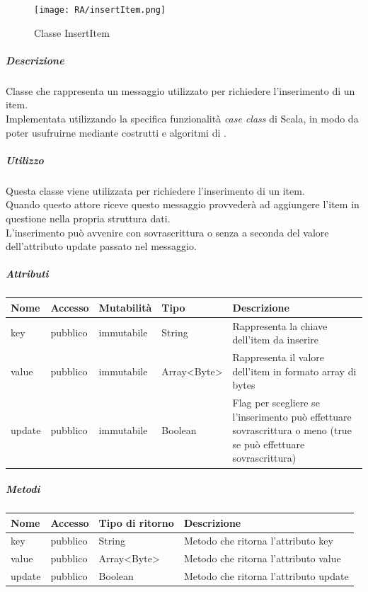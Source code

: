 \documentclass{scalatekids-article}
\begin{document}
\begin{figure}[H]
  \begin{center}
    \texttt{[image: RA/insertItem.png]}
    \caption{Classe InsertItem}
  \end{center}
\end{figure}

\subparagraph{Descrizione}
Classe che rappresenta un messaggio utilizzato per richiedere l'inserimento di
un item.\\Implementata utilizzando la specifica funzionalità \textit{case class} di Scala,
in modo da poter usufruirne mediante costrutti e algoritmi di
.

\subparagraph{Utilizzo}
Questa classe viene utilizzata per richiedere l'inserimento di un item.\\Quando questo attore riceve questo messaggio provvederà ad aggiungere l'item in
questione nella propria struttura dati.\\L'inserimento può avvenire con
sovrascrittura o senza a seconda del valore dell'attributo update passato nel
messaggio.

\subparagraph{Attributi}
\begin{tabular}{| p{2cm} | p{1.5cm} | p{2cm} | p{3cm} | p{8.5cm} |}
  \hline
  Nome & Accesso & Mutabilità & Tipo & Descrizione\\
  \hline
  key & pubblico & immutabile & String & Rappresenta la chiave dell'item da inserire\\
  \hline
  value & pubblico & immutabile & Array<Byte> & Rappresenta il valore dell'item in formato array di bytes\\
  \hline
  update & pubblico & immutabile & Boolean & Flag per scegliere se l'inserimento può effettuare sovrascrittura o meno (true se può effettuare sovrascrittura)\\
  \hline
\end{tabular}

\subparagraph{Metodi}
\begin{tabular}{| l | l | l | l |}
  \hline
  Nome & Accesso & Tipo di ritorno & Descrizione\\
  \hline
  key & pubblico & String & Metodo che ritorna l'attributo key\\
  \hline
  value & pubblico & Array<Byte> & Metodo che ritorna l'attributo value\\
  \hline
  update & pubblico & Boolean & Metodo che ritorna l'attributo update\\
  \hline
\end{tabular}
\end{document}

